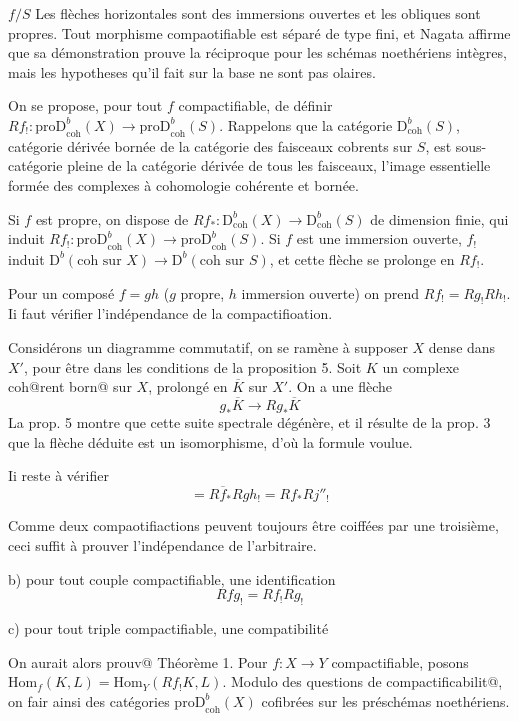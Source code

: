 \documentclass[12pt]{article}
\begin{document}
$f / S$
Les flèches horizontales sont des immersions ouvertes et les obliques sont propres.
Tout morphisme compaotifiable est séparé de type fini, et Nagata affirme que sa démonstration prouve la réciproque pour les schémas noethériens intègres, mais les hypotheses qu'il fait sur la base ne sont pas olaires.

On se propose, pour tout $f$ compactifiable, de définir $Rf_{!}: \mathrm{proD}_{\mathrm{coh}}^{b}(X) \to \mathrm{proD}_{\mathrm{coh}}^{b}(S)$.
Rappelons que la catégorie $\mathrm{D}_{\mathrm{coh}}^{b}(S)$, catégorie dérivée bornée de la catégorie des faisceaux cobrents sur $S$, est sous-catégorie pleine de la catégorie dérivée de tous les faisceaux, l'image essentielle formée des complexes à cohomologie cohérente et bornée.

Si $f$ est propre, on dispose de $Rf_{*}: \mathrm{D}_{\mathrm{coh}}^{b}(X) \to \mathrm{D}_{\mathrm{coh}}^{b}(S)$ de dimension finie, qui induit $Rf_{!}: \mathrm{proD}_{\mathrm{coh}}^{b}(X) \to \mathrm{proD}_{\mathrm{coh}}^{b}(S)$.
Si $f$ est une immersion ouverte, $f_{!}$ induit $\mathrm{D}^{b}(\mathrm{coh}\text{ sur }X) \to \mathrm{D}^{b}(\mathrm{coh}\text{ sur }S)$, et cette flèche se prolonge en $Rf_{!}$.

Pour un composé $f=gh$ ($g$ propre, $h$ immersion ouverte) on prend $Rf_{!}=Rg_{!}Rh_{!}$.
Ii faut vérifier l'indépendance de la compactifioation.

Considérons un diagramme commutatif, on se ramène à supposer $X$ dense dans $X'$, pour être dans les conditions de la proposition 5.
Soit $K$ un complexe coh@rent born@ sur $X$, prolongé en $\overline{K}$ sur $X'$.
On a une flèche
\[g_{*} \overline{K} \to Rg_{*} \overline{K}\]
La prop. 5 montre que cette suite spectrale dégénère, et il résulte de la prop. 3 que la flèche déduite est un isomorphisme, d'où la formule voulue.

Ii reste à vérifier
\[=R \overline{f}_{*} R g h_{!}=R f_{*} R j''_{!}\]

Comme deux compaotifiactions peuvent toujours être coiffées par une troisième, ceci suffit à prouver l'indépendance de l'arbitraire.

b) pour tout couple compactifiable, une identification
\[Rfg_{!}=R f_{!} Rg_{!}\]

c) pour tout triple compactifiable, une compatibilité

On aurait alors prouv@
Théorème 1. Pour $f: X \to Y$ compactifiable, posons $\mathrm{Hom}_{f}(K,L)=\mathrm{Hom}_{Y}(Rf_{!}K,L)$.
Modulo des questions de compactificabilit@, on fair ainsi des catégories $\mathrm{proD}_{\mathrm{coh}}^{b}(X)$ cofibrées sur les préschémas noethériens.
\end{document}
